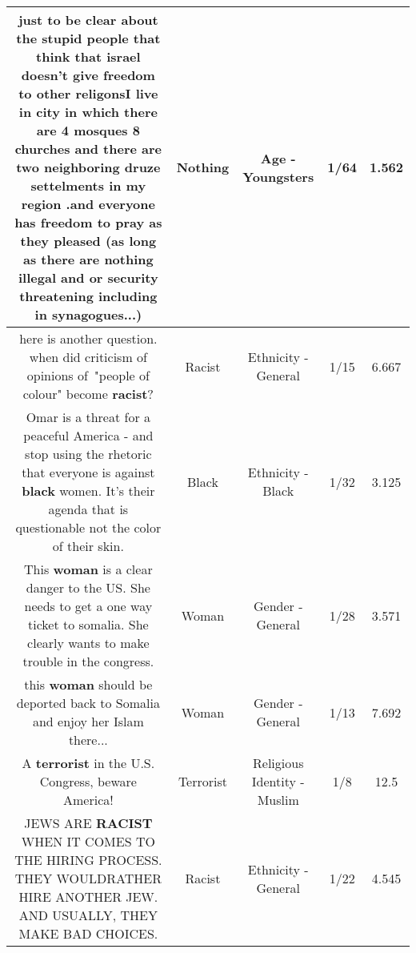 \documentclass[11pt]{article}
\newlength\mylength
\begin{document}
\begin{center}
\begin{longtable}{|C{.65\mylength}|C{.30\mylength}|C{.12\mylength}|C{.12\mylength}|C{.12\mylength}|}
  \small just to be  clear about the stupid people that think that israel doesn't give freedom to other religonsI live in city in which there are 4 mosques 8 churches  and there  are two neighboring druze settelments  in my region .and everyone has freedom to pray as they pleased (as long as there are \textbf{nothing} illegal and or security threatening  including in synagogues...)\normalsize   & Nothing & Age - Youngsters & 1/64 & 1.562 \\  \hline
  \small here is another question. when did criticism of opinions of "people of colour" become \textbf{racist}?\normalsize   & Racist & Ethnicity - General & 1/15 & 6.667 \\  \hline
  \small Omar is a threat for a peaceful America - and stop using the rhetoric that everyone is against \textbf{black} women. It's their agenda that is questionable not the color of their skin.\normalsize   & Black & Ethnicity - Black & 1/32 & 3.125 \\  \hline
  \small This \textbf{woman} is a clear danger to the US.   She needs to get a one way ticket to somalia.   She clearly wants to make trouble in the congress.\normalsize   & Woman & Gender - General & 1/28 & 3.571 \\  \hline
  \small this \textbf{woman} should be deported back to Somalia and enjoy her Islam there...\normalsize   & Woman & Gender - General & 1/13 & 7.692 \\  \hline
  \small A \textbf{terrorist} in the U.S. Congress, beware America!\normalsize   & Terrorist & Religious Identity - Muslim & 1/8 & 12.5 \\  \hline
  \small JEWS ARE \textbf{RACIST} WHEN IT COMES TO THE HIRING PROCESS. THEY WOULDRATHER HIRE ANOTHER JEW.  AND USUALLY, THEY MAKE BAD CHOICES.\normalsize   & Racist & Ethnicity - General & 1/22 & 4.545 \\  \hline

\end{longtable}
\end{center}
\end{document}
